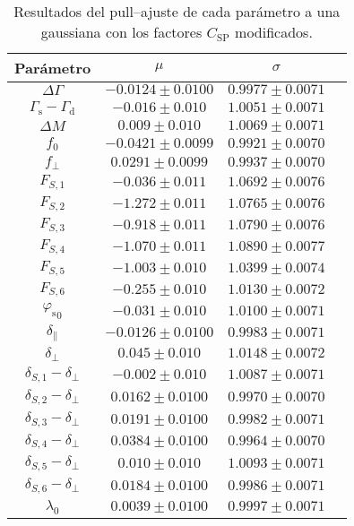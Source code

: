 \begin{subappendices}
\begin{table}[H]
  \centering
  \begin{tabular}{cccc}
  \toprule
  Parámetro & $\mu$ & $\sigma$ & \\ 
  \midrule
$\Delta \Gamma$ &  $-0.0124 \pm 0.0100$ &  $0.9977 \pm 0.0071$ & \\
$\Gamma_{\mathrm{s}} - \Gamma_{\mathrm{d}}$ &  $-0.016 \pm 0.010$ &  $1.0051 \pm 0.0071$ & \\
$\Delta M$ &  $0.009 \pm 0.010$ &  $1.0069 \pm 0.0071$ & \\
$f_{0}$ &  $-0.0421 \pm 0.0099$ &  $0.9921 \pm 0.0070$ & \\
$f_{\perp}$ &  $0.0291 \pm 0.0099$ &  $0.9937 \pm 0.0070$ & \\
$F_{S,1}$ &  $-0.036 \pm 0.011$ &  $1.0692 \pm 0.0076$ & \\
$F_{S,2}$ &  $-1.272 \pm 0.011$ &  $1.0765 \pm 0.0076$ & \\
$F_{S,3}$ &  $-0.918 \pm 0.011$ &  $1.0790 \pm 0.0076$ & \\
$F_{S,4}$ &  $-1.070 \pm 0.011$ &  $1.0890 \pm 0.0077$ & \\
$F_{S,5}$ &  $-1.003 \pm 0.010$ &  $1.0399 \pm 0.0074$ & \\
$F_{S,6}$ &  $-0.255 \pm 0.010$ &  $1.0130 \pm 0.0072$ & \\
${\varphi_{\mathrm{s}}}_0$ &  $-0.031 \pm 0.010$ &  $1.0100 \pm 0.0071$ & \\
$\delta_{\parallel}$ &  $-0.0126 \pm 0.0100$ &  $0.9983 \pm 0.0071$ & \\
$\delta_{\perp}$ &  $0.045 \pm 0.010$ &  $1.0148 \pm 0.0072$ & \\
$\delta_{S,1}- \delta_{\perp}$ &  $-0.002 \pm 0.010$ &  $1.0087 \pm 0.0071$ & \\
$\delta_{S,2}- \delta_{\perp}$ &  $0.0162 \pm 0.0100$ &  $0.9970 \pm 0.0070$ & \\
$\delta_{S,3}- \delta_{\perp}$ &  $0.0191 \pm 0.0100$ &  $0.9982 \pm 0.0071$ & \\
$\delta_{S,4}- \delta_{\perp}$ &  $0.0384 \pm 0.0100$ &  $0.9964 \pm 0.0070$ & \\
$\delta_{S,5}- \delta_{\perp}$ &  $0.010 \pm 0.010$ &  $1.0093 \pm 0.0071$ & \\
$\delta_{S,6}- \delta_{\perp}$ &  $0.0184 \pm 0.0100$ &  $0.9986 \pm 0.0071$ & \\
$\lambda_0$ &  $0.0039 \pm 0.0100$ &  $0.9997 \pm 0.0071$ & \\
  \bottomrule  
  \end{tabular}
  \caption{Resultados del pull--ajuste de cada parámetro a una gaussiana con los factores $C_{\text{SP}}$ modificados.} \label{tab:pullscsp}
\end{table}





\end{subappendices}
